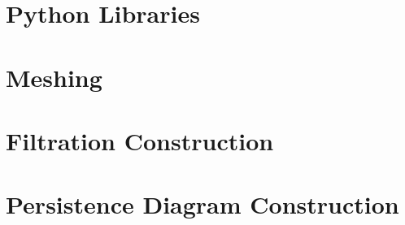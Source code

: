 \documentclass[ma]{uncgdissertationexp2}
\theoremstyle{plain}
\theoremstyle{definition}
\theoremstyle{remark}
\begin{document}
\section{Python Libraries}

\section{Meshing}

\section{Filtration Construction}

\section{Persistence Diagram Construction}
\end{document}

